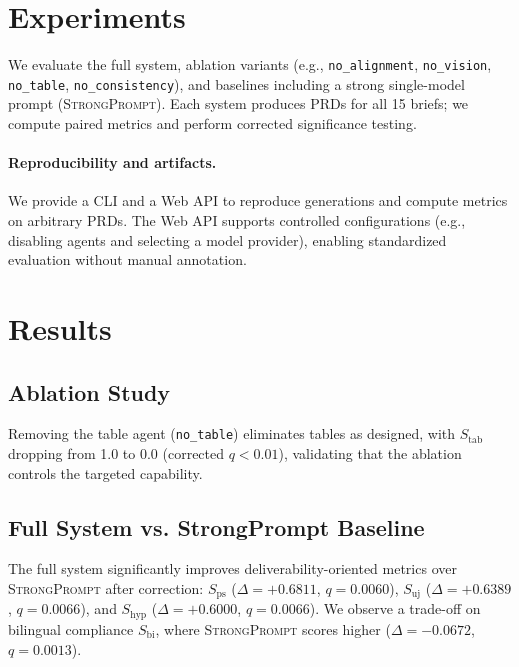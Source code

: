\documentclass[11pt]{article}
\begin{document}
\section{Experiments}
\label{sec:experiments}

We evaluate the full system, ablation variants (e.g., \texttt{no\_alignment}, \texttt{no\_vision}, \texttt{no\_table}, \texttt{no\_consistency}), and baselines including a strong single-model prompt (\textsc{StrongPrompt}).
Each system produces PRDs for all 15 briefs; we compute paired metrics and perform corrected significance testing.

\paragraph{Reproducibility and artifacts.}
We provide a CLI and a Web API to reproduce generations and compute metrics on arbitrary PRDs.
The Web API supports controlled configurations (e.g., disabling agents and selecting a model provider), enabling standardized evaluation without manual annotation.

\section{Results}
\label{sec:results}

\subsection{Ablation Study}
Removing the table agent (\texttt{no\_table}) eliminates tables as designed, with \(S_{\mathrm{tab}}\) dropping from 1.0 to 0.0 (corrected \(q<0.01\)), validating that the ablation controls the targeted capability.



\subsection{Full System vs. StrongPrompt Baseline}
The full system significantly improves deliverability-oriented metrics over \textsc{StrongPrompt} after correction:
\(S_{\mathrm{ps}}\) (\(\Delta=+0.6811\), \(q=0.0060\)),
\(S_{\mathrm{uj}}\) (\(\Delta=+0.6389\), \(q=0.0066\)),
and \(S_{\mathrm{hyp}}\) (\(\Delta=+0.6000\), \(q=0.0066\)).
We observe a trade-off on bilingual compliance \(S_{\mathrm{bi}}\), where \textsc{StrongPrompt} scores higher (\(\Delta=-0.0672\), \(q=0.0013\)).


\end{document}
